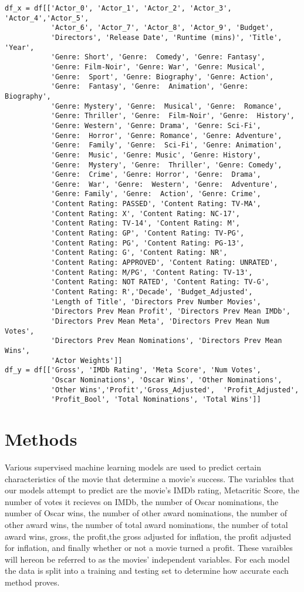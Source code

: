 \documentclass{article}
\begin{document}
\begin{lstlisting}
df_x = df[['Actor_0', 'Actor_1', 'Actor_2', 'Actor_3', 'Actor_4','Actor_5',
		   'Actor_6', 'Actor_7', 'Actor_8', 'Actor_9', 'Budget',
		   'Directors', 'Release Date', 'Runtime (mins)', 'Title', 'Year',
		   'Genre: Short', 'Genre:  Comedy', 'Genre: Fantasy',
		   'Genre: Film-Noir', 'Genre: War', 'Genre: Musical', 
		   'Genre:  Sport', 'Genre: Biography', 'Genre: Action', 
		   'Genre:  Fantasy', 'Genre:  Animation', 'Genre:  Biography',
		   'Genre: Mystery', 'Genre:  Musical', 'Genre:  Romance', 
		   'Genre: Thriller', 'Genre:  Film-Noir', 'Genre:  History',
		   'Genre: Western', 'Genre: Drama', 'Genre: Sci-Fi', 
		   'Genre:  Horror', 'Genre: Romance', 'Genre: Adventure',
		   'Genre:  Family', 'Genre:  Sci-Fi', 'Genre: Animation',
		   'Genre:  Music', 'Genre: Music', 'Genre: History',
		   'Genre:  Mystery', 'Genre:  Thriller', 'Genre: Comedy',
		   'Genre:  Crime', 'Genre: Horror', 'Genre:  Drama',
		   'Genre:  War', 'Genre:  Western', 'Genre:  Adventure',
		   'Genre: Family', 'Genre:  Action', 'Genre: Crime',
		   'Content Rating: PASSED', 'Content Rating: TV-MA',
		   'Content Rating: X', 'Content Rating: NC-17',
		   'Content Rating: TV-14', 'Content Rating: M', 
		   'Content Rating: GP', 'Content Rating: TV-PG',
		   'Content Rating: PG', 'Content Rating: PG-13',
		   'Content Rating: G', 'Content Rating: NR', 
		   'Content Rating: APPROVED', 'Content Rating: UNRATED',
		   'Content Rating: M/PG', 'Content Rating: TV-13',
		   'Content Rating: NOT RATED', 'Content Rating: TV-G',
		   'Content Rating: R','Decade', 'Budget_Adjusted',
		   'Length of Title', 'Directors Prev Number Movies',
		   'Directors Prev Mean Profit', 'Directors Prev Mean IMDb',
		   'Directors Prev Mean Meta', 'Directors Prev Mean Num Votes',
		   'Directors Prev Mean Nominations', 'Directors Prev Mean Wins',
		   'Actor Weights']]
df_y = df[['Gross', 'IMDb Rating', 'Meta Score', 'Num Votes',
           'Oscar Nominations', 'Oscar Wins', 'Other Nominations',
           'Other Wins','Profit','Gross_Adjusted',  'Profit_Adjusted',
           'Profit_Bool', 'Total Nominations', 'Total Wins']]
\end{lstlisting}

\hypertarget{methods}{%
	\section{Methods}\label{methods}}

Various supervised machine learning models are used to predict certain
characteristics of the movie that determine a movie's success. The
variables that our models attempt to predict are the movie's IMDb
rating, Metacritic Score, the number of votes it recieves on IMDb, the
number of Oscar nominations, the number of Oscar wins, the number of
other award nominations, the number of other award wins, the number of
total award nominations, the number of total award wins, gross, the
profit,the gross adjusted for inflation, the profit adjusted for
inflation, and finally whether or not a movie turned a profit. These
varaibles will hereon be referred to as the movies' independent
variables. For each model the data is split into a training and testing
set to determine how accurate each method proves.
\end{document}
